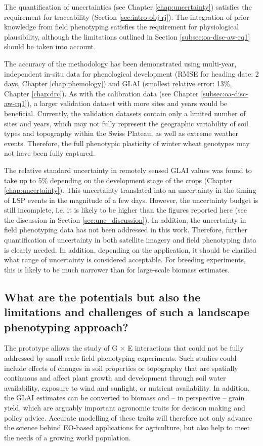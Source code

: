 The quantification of uncertainties (see Chapter \ref{chap:uncertainty}) satisfies the requirement for traceability (Section \ref{sec:intro-obj-rj}). The integration of prior knowledge from field phenotyping satisfies the requirement for physiological plausibility, although the limitations outlined in Section \ref{subsec:oa-disc-aw-rq1} should be taken into account.

The accuracy of the methodology has been demonstrated using multi-year, independent in-situ data for phenological development (RMSE for heading date: 2 days, Chapter \ref{chap:phemology}) and GLAI (smallest relative error: 13\%, Chapter \ref{chap:drc}). As with the calibration data (see Chapter \ref{subsec:oa-disc-aw-rq1}), a larger validation dataset with more sites and years would be beneficial. Currently, the validation datasets contain only a limited number of sites and years, which may not fully represent the geographic variability of soil types and topography within the Swiss Plateau, as well as extreme weather events. Therefore, the full phenotypic plasticity of winter wheat genotypes may not have been fully captured.

The relative standard uncertainty in remotely sensed \gls{GLAI} values was found to take up to 5\% depending on the development stage of the crops (Chapter \ref{chap:uncertainty}). This uncertainty translated into an uncertainty in the timing of \gls{LSP} events in the magnitude of a few days. However, the uncertainty budget is still incomplete, i.e. it is likely to be higher than the figures reported here (see the discussion in Section \ref{sec:unc_discussion}). In addition, the uncertainty in field phenotyping data has not been addressed in this work. Therefore, further quantification of uncertainty in both satellite imagery and field phenotyping data is clearly needed. In addition, depending on the application, it should be clarified what range of uncertainty is considered acceptable. For breeding experiments, this is likely to be much narrower than for large-scale biomass estimates.

\subsection{What are the potentials but also the limitations and challenges of such a landscape phenotyping approach?}

The prototype allows the study of G $\times$ E interactions that could not be fully addressed by small-scale field phenotyping experiments. Such studies could include effects of changes in soil properties or topography that are spatially continuous and affect plant growth and development through soil water availability, exposure to wind and sunlight, or nutrient availability. In addition, the \gls{GLAI} estimates can be converted to biomass \citep{aase_relationship_1978} and -- in perspective -- grain yield, which are arguably important agronomic traits for decision making and policy advice. Accurate modelling of these traits will therefore not only advance the science behind \gls{EO}-based applications for agriculture, but also help to meet the needs of a growing world population.

